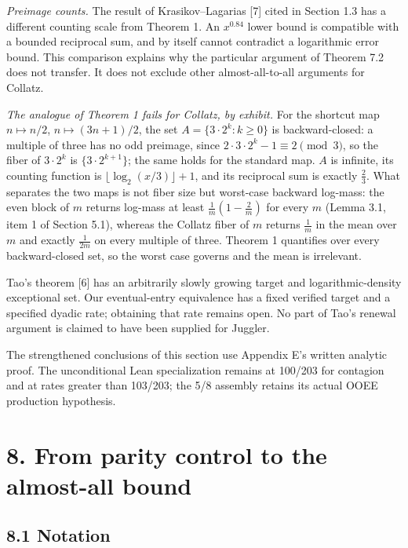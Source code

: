 \documentclass[11pt,a4paper]{article}
\begin{document}
\emph{Preimage counts.} The result of Krasikov--Lagarias {[}7{]} cited
in Section 1.3 has a different counting scale from Theorem 1. An
\(x^{0.84}\) lower bound is compatible with a bounded reciprocal sum,
and by itself cannot contradict a logarithmic error bound. This
comparison explains why the particular argument of Theorem 7.2 does not
transfer. It does not exclude other almost-all-to-all arguments for
Collatz.

\emph{The analogue of Theorem 1 fails for Collatz, by exhibit.} For the
shortcut map \(n\mapsto n/2\), \(n\mapsto(3n+1)/2\), the set
\(A=\{3\cdot2^k:k\ge0\}\) is backward-closed: a multiple of three has no
odd preimage, since \(2\cdot3\cdot2^k-1\equiv2\pmod3\), so the fiber of
\(3\cdot2^k\) is \(\{3\cdot2^{k+1}\}\); the same holds for the standard
map. \(A\) is infinite, its counting function is
\(\lfloor\log_2(x/3)\rfloor+1\), and its reciprocal sum is exactly
\(\tfrac23\). What separates the two maps is not fiber size but
worst-case backward log-mass: the even block of \(m\) returns log-mass
at least \(\tfrac1m(1-\tfrac2m)\) for every \(m\) (Lemma 3.1, item 1 of
Section 5.1), whereas the Collatz fiber of \(m\) returns \(\tfrac1m\) in
the mean over \(m\) and exactly \(\tfrac1{2m}\) on every multiple of
three. Theorem 1 quantifies over every backward-closed set, so the worst
case governs and the mean is irrelevant.

Tao's theorem {[}6{]} has an arbitrarily slowly growing target and
logarithmic-density exceptional set. Our eventual-entry equivalence has
a fixed verified target and a specified dyadic rate; obtaining that rate
remains open. No part of Tao's renewal argument is claimed to have been
supplied for Juggler.

The strengthened conclusions of this section use Appendix E's written
analytic proof. The unconditional Lean specialization remains at 100/203
for contagion and at rates greater than 103/203; the 5/8 assembly
retains its actual OOEE production hypothesis.

\section{8. From parity control to the almost-all
bound}\label{from-parity-control-to-the-almost-all-bound}

\subsection{8.1 Notation}\label{notation}
\end{document}
